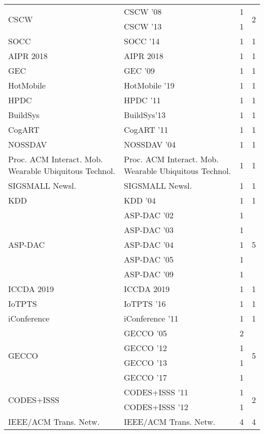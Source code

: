 \begin{table*}[t]
\begin{tabular}{llrr}
\multirow{2}{*}{CSCW } & CSCW '08 & 1 & \multirow{2}{*}{2}\\
& CSCW '13 & 1 &\\
\multirow{1}{*}{SOCC } & SOCC '14 & 1 & \multirow{1}{*}{1}\\
\multirow{1}{*}{AIPR 2018} & AIPR 2018 & 1 & \multirow{1}{*}{1}\\
\multirow{1}{*}{GEC } & GEC '09 & 1 & \multirow{1}{*}{1}\\
\multirow{1}{*}{HotMobile } & HotMobile '19 & 1 & \multirow{1}{*}{1}\\
\multirow{1}{*}{HPDC } & HPDC '11 & 1 & \multirow{1}{*}{1}\\
\multirow{1}{*}{BuildSys} & BuildSys'13 & 1 & \multirow{1}{*}{1}\\
\multirow{1}{*}{CogART } & CogART '11 & 1 & \multirow{1}{*}{1}\\
\multirow{1}{*}{NOSSDAV } & NOSSDAV '04 & 1 & \multirow{1}{*}{1}\\
\multirow{1}{*}{Proc. ACM Interact. Mob. Wearable Ubiquitous Technol.} & Proc. ACM Interact. Mob. Wearable Ubiquitous Technol. & 1 & \multirow{1}{*}{1}\\
\multirow{1}{*}{SIGSMALL Newsl.} & SIGSMALL Newsl. & 1 & \multirow{1}{*}{1}\\
\multirow{1}{*}{KDD } & KDD '04 & 1 & \multirow{1}{*}{1}\\
\multirow{5}{*}{ASP-DAC } & ASP-DAC '02 & 1 & \multirow{5}{*}{5}\\
& ASP-DAC '03 & 1 &\\
& ASP-DAC '04 & 1 &\\
& ASP-DAC '05 & 1 &\\
& ASP-DAC '09 & 1 &\\
\multirow{1}{*}{ICCDA 2019} & ICCDA 2019 & 1 & \multirow{1}{*}{1}\\
\multirow{1}{*}{IoTPTS } & IoTPTS '16 & 1 & \multirow{1}{*}{1}\\
\multirow{1}{*}{iConference } & iConference '11 & 1 & \multirow{1}{*}{1}\\
\multirow{4}{*}{GECCO } & GECCO '05 & 2 & \multirow{4}{*}{5}\\
& GECCO '12 & 1 &\\
& GECCO '13 & 1 &\\
& GECCO '17 & 1 &\\
\multirow{2}{*}{CODES+ISSS } & CODES+ISSS '11 & 1 & \multirow{2}{*}{2}\\
& CODES+ISSS '12 & 1 &\\
\multirow{1}{*}{IEEE/ACM Trans. Netw.} & IEEE/ACM Trans. Netw. & 4 & \multirow{1}{*}{4}\\

\end{tabular}
\end{table*}
